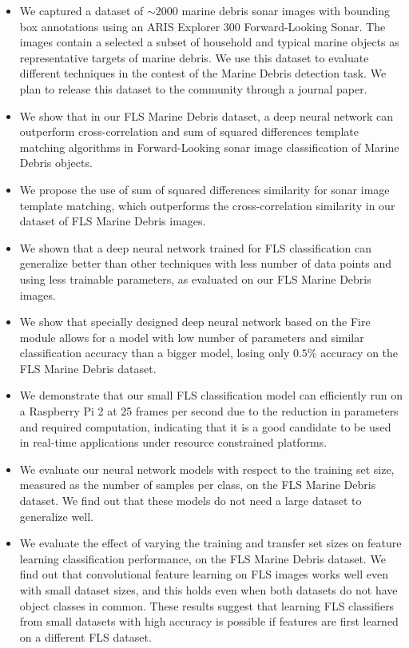 \begin{itemize}
    \item We captured a dataset of $\sim 2000$ marine debris sonar images with bounding box annotations using an ARIS Explorer 300 Forward-Looking Sonar. The images contain a selected a subset of household and typical marine objects as representative targets of marine debris. We use this dataset to evaluate different techniques in the contest of the Marine Debris detection task. We plan to release this dataset to the community through a journal paper.
    
	\item We show that in our FLS Marine Debris dataset, a deep neural network can outperform cross-correlation\cite{hurtos2013automatic} and sum of squared differences template matching algorithms in Forward-Looking sonar image classification of Marine Debris objects.
	\item We propose the use of sum of squared differences similarity for sonar image template matching, which outperforms the cross-correlation similarity in our dataset of FLS Marine Debris images.
	\item We shown that a deep neural network trained for FLS classification can generalize better than other techniques with less number of data points and using less trainable parameters, as evaluated on our FLS Marine Debris images.
    
    \item We show that specially designed deep neural network based on the Fire module\cite{iandola2016squeezenet} allows for a model with low number of parameters and similar classification accuracy than a bigger model, losing only $0.5 \%$ accuracy on the FLS Marine Debris dataset.
    
    \item We demonstrate that our small FLS classification model can efficiently run on a Raspberry Pi 2 at 25 frames per second due to the reduction in parameters and required computation, indicating that it is a good candidate to be used in real-time applications under resource constrained platforms.
    
	\item We evaluate our neural network models with respect to the training set size, measured as the number of samples per class, on the FLS Marine Debris dataset. We find out that these models do not need a large dataset to generalize well.
	\item We evaluate the effect of varying the training and transfer set sizes on feature learning classification performance, on the FLS Marine Debris dataset. We find out that convolutional feature learning on FLS images works well even with small dataset sizes, and this holds even when both datasets do not have object classes in common. These results suggest that learning FLS classifiers from small datasets with high accuracy is possible if features are first learned on a different FLS dataset.
    

\end{itemize}

